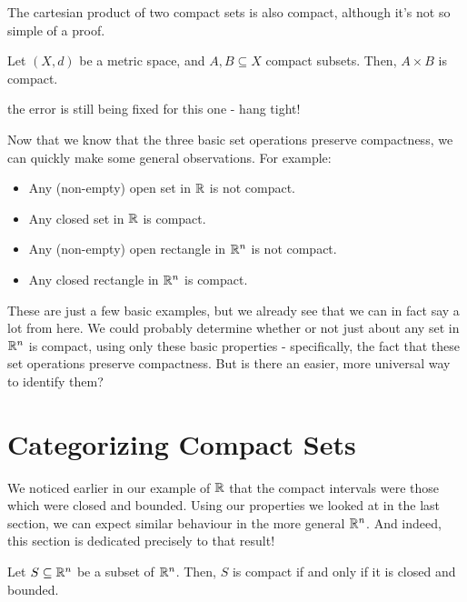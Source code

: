 \documentclass{article}
\begin{document}
The cartesian product of two compact sets is also compact, although it's not so simple of a proof.
\newpage

\begin{lm}
    Let $ (X, d) $ be a metric space, and $ A, B \subseteq X $ compact subsets.
    Then, $ A \times B $ is compact.
\end{lm}

\begin{pf}
    the error is still being fixed for this one - hang tight!
\end{pf}

Now that we know that the three basic set operations preserve compactness, we can quickly make
some general observations. For example:
\begin{itemize}
    \item Any (non-empty) open set in $ \mathbb{R} $ is not compact.
    \item Any closed set in $ \mathbb{R} $ is compact.
    \item Any (non-empty) open rectangle in $ \mathbb{R}^{n} $ is not compact.
    \item Any closed rectangle in $ \mathbb{R}^{n} $ is compact.
\end{itemize}

These are just a few basic examples, but we already see that we can in fact say a lot from here.
We could probably determine whether or not just about any set in $ \mathbb{R}^{n} $ is compact, using
only these basic properties - specifically, the fact that these set operations preserve compactness.
But is there an easier, more universal way to identify them?

\section{Categorizing Compact Sets}

We noticed earlier in our example of $ \mathbb{R} $ that the compact intervals were those which were
closed and bounded. Using our properties we looked at in the last section, we can expect similar
behaviour in the more general $ \mathbb{R}^{n} $. And indeed, this section is dedicated precisely to
that result!

\begin{thm}[title=Heine-Borel Theorem]
    Let $ S \subseteq \mathbb{R}^{n} $ be a subset of $ \mathbb{R}^{n} $.
    Then, $ S $ is compact if and only if it is closed and bounded.
\end{thm}
\end{document}
